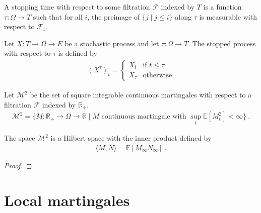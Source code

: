 \begin{definition}\label{def:IsStoppingTime}
  \mathlibok
A stopping time with respect to some filtration $\mathcal{F}$ indexed by $T$ is a function $\tau : \Omega \to T$ such that for all $i$, the preimage of $\{j \mid j \le i\}$ along $\tau$ is measurable with respect to $\mathcal{F}_i$.
\end{definition}


\begin{definition}\label{def:stoppedProcess}
  \mathlibok
Let $X : T \to \Omega \to E$ be a stochastic process and let $\tau : \Omega \to T$.
The stopped process with respect to $\tau$ is defined by
\begin{align*}
  (X^{\tau})_t = \begin{cases}
    X_t & \text{if } t \le \tau \\
    X_{\tau} & \text{otherwise}
  \end{cases}
\end{align*}
\end{definition}


\begin{definition}\label{def:squareIntegrableMartingales}
Let $\mathcal{M}^2$ be the set of square integrable continuous martingales with respect to a filtration $\mathcal{F}$ indexed by $\mathbb{R}_+$,
\begin{align*}
  \mathcal{M}^2
  = \{ M : \mathbb{R}_+ \to \Omega \to \mathbb{R} \mid M \text{ continuous martingale with } \sup_{t}\mathbb{E}[M_t^2] < \infty \}
  \: .
\end{align*}
\end{definition}


\begin{theorem}\label{thm:hilbertSpace_squareIntegrableMartingales}
The space $\mathcal{M}^2$ is a Hilbert space with the inner product defined by
\begin{align*}
  \langle M, N \rangle = \mathbb{E}[M_\infty N_\infty]
  \: .
\end{align*}
\end{theorem}

\begin{proof}

\end{proof}


\section{Local martingales}

